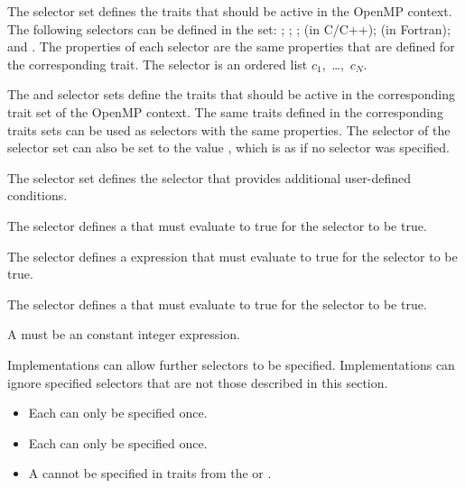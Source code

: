 The  selector set defines the  traits that should
be active in the OpenMP context. The following selectors can be defined in the
 set: ; ; ; 
(in C/C++);  (in Fortran); and . The properties of each
selector are the same properties that are defined for the corresponding trait.
The  selector is an ordered list $c_{1}$,~\ldots,~$c_{N}$.

The  and  selector sets define the traits that
should be active in the corresponding trait set of the OpenMP context. The
same traits defined in the corresponding traits sets can be used as selectors
with the same properties. The  selector of the 
selector set can also be set to the value , which is as if no
 selector was specified.

The  selector set defines the  selector that provides 
additional user-defined conditions.

\begin{cspecific}
The \code{)} selector defines a  that must evaluate to true for the selector to be true.
\end{cspecific}

\begin{cppspecific}
The \code{)} selector defines a  
expression that must evaluate to true for the selector to be true.
\end{cppspecific}

\begin{fortranspecific}
The \code{)} selector defines a  that must evaluate to true for the selector to be true.
\end{fortranspecific}

A  must be an constant integer expression.

Implementations can allow further selectors to be specified. Implementations can 
ignore specified selectors that are not those described in this section.

\restrictions
\begin{itemize}
\item Each  can only be specified once.
\item Each  can only be specified once.
\item A  cannot be specified in traits from the  
      or  .
\end{itemize}



